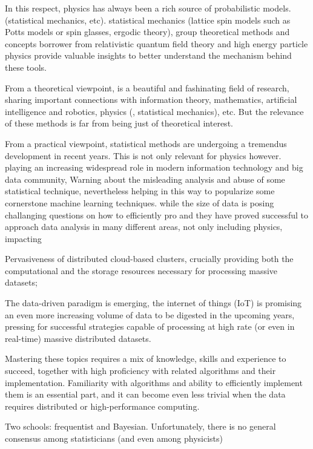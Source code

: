In this respect, 
physics has always been a rich source of probabilistic models.
(statistical
mechanics, etc).
statistical mechanics (lattice spin models such as Potts models or spin glasses, ergodic theory), group
theoretical methods and concepts borrower from 
relativistic 
quantum field theory  and high energy particle physics provide valuable
insights  to better understand 
the mechanism behind these tools.

From a theoretical viewpoint,
is a beautiful and
fashinating field of research, 
sharing 
important connections with information theory, mathematics, 
artificial intelligence and robotics, physics (\eg, statistical
mechanics), etc. 
But the relevance of these methods is far from being just of theoretical
interest. 

From a practical viewpoint, statistical methods 
are undergoing a tremendus  development in recent years.
This is not only relevant for physics however.
playing an increasing widespread role  in modern information
technology and big data community, 
Warning about the misleading analysis and abuse of some statistical technique,
nevertheless 
helping in this way to popularize some cornerstone
machine learning techniques. 
while the size of data is posing challanging questions on how to efficiently
pro
and they 
have proved successful to approach data analysis in many
different areas, not only including physics, 
impacting 

Pervasiveness of distributed cloud-based clusters, crucially providing both the 
computational and the storage resources necessary for processing massive datasets;

The data-driven paradigm is emerging, the internet of things (IoT) is promising
an even more 
increasing  volume of 
data
to be digested in the upcoming years, 
pressing for successful strategies capable of 
processing at high rate (or even in real-time) massive distributed datasets. 

Mastering these topics requires a mix of knowledge, skills and experience to
succeed, together with high proficiency with related algorithms and their
implementation. 
Familiarity with algorithms
and ability to efficiently implement them 
is an essential part, 
and it can become even less trivial when the data requires distributed or
high-performance computing.


Two schools: frequentist and Bayesian.
Unfortunately, there is no general consensus among statisticians (and even
among physicists)

